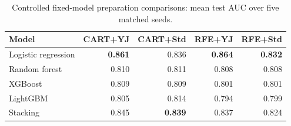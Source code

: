 \begin{table}[H]
\centering\small
\caption{Controlled fixed-model preparation comparisons: mean test AUC over five matched seeds.}
\label{tab:holdout-preparation}
\begin{tabular}{lrrrr}
\toprule
Model & CART+YJ & CART+Std & RFE+YJ & RFE+Std \\
\midrule
Logistic regression & \textbf{0.861} & 0.836 & \textbf{0.864} & \textbf{0.832} \\
Random forest & 0.810 & 0.811 & 0.808 & 0.808 \\
XGBoost & 0.809 & 0.809 & 0.801 & 0.801 \\
LightGBM & 0.805 & 0.814 & 0.794 & 0.799 \\
Stacking & 0.845 & \textbf{0.839} & 0.837 & 0.824 \\
\bottomrule
\end{tabular}
\end{table}
